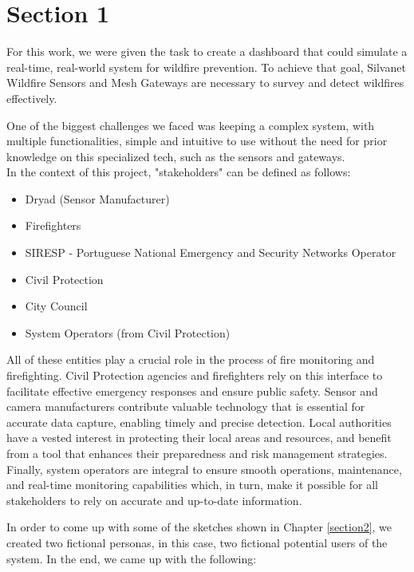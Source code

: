 \chapter{Section 1} \label{section1}
For this work, we were given the task to create a dashboard 
that could simulate a real-time, real-world system for wildfire 
prevention. To achieve
that goal, Silvanet Wildfire Sensors and Mesh Gateways are necessary to
survey and detect wildfires effectively. \par 
One of the biggest challenges we faced was keeping a complex system, with multiple functionalities, simple
and intuitive to use without the need for prior knowledge on this
specialized tech, such as the sensors and gateways. \\
In the context of this project, "stakeholders" can be defined as follows:
\begin{itemize}
    \item Dryad (Sensor Manufacturer)
    \item Firefighters
    \item SIRESP - Portuguese National Emergency 
    and Security Networks Operator 
    \item Civil Protection
    \item City Council
    \item System Operators (from Civil Protection)
\end{itemize} \par 
All of these entities play a crucial role in the process of fire monitoring and firefighting. 
Civil Protection agencies and firefighters rely on this 
interface to facilitate effective emergency responses and 
ensure public safety. Sensor and camera manufacturers contribute 
valuable technology that is essential for accurate data capture, 
enabling timely and precise detection. Local authorities have 
a vested interest in protecting their local areas and resources, 
and benefit from a tool that enhances their preparedness and 
risk management strategies. Finally, system operators are integral 
to ensure smooth operations, maintenance, and real-time monitoring 
capabilities which, in turn, make it possible for all stakeholders 
to rely on accurate and up-to-date information.

In order to come up with some of the sketches shown in Chapter \ref{section2},
we created two fictional personas, in this case, two 
fictional potential users of the system. In the end, we came up 
with the following:
 \\

